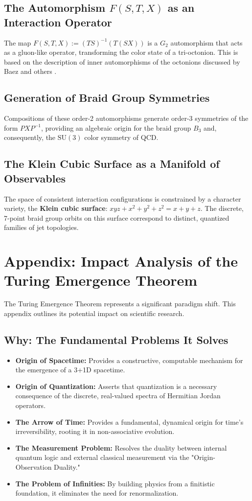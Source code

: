\documentclass[11pt, a4paper]{article}
\theoremstyle{definition}
\theoremstyle{remark}
\begin{document}
\subsection{The Automorphism $F(S,T,X)$ as an Interaction Operator}
The map $F(S,T,X) := (TS)^{-1}(T(SX))$ is a $G_2$ automorphism that acts as a gluon-like operator, transforming the color state of a tri-octonion. This is based on the description of inner automorphisms of the octonions discussed by Baez and others \cite{BaezBlog}.

\subsection{Generation of Braid Group Symmetries}
Compositions of these order-2 automorphisms generate order-3 symmetries of the form $PXP^{-1}$, providing an algebraic origin for the braid group $B_3$ and, consequently, the $\mathrm{SU}(3)$ color symmetry of QCD.

\subsection{The Klein Cubic Surface as a Manifold of Observables}
The space of consistent interaction configurations is constrained by a character variety, the \textbf{Klein cubic surface}: $xyz + x^2 + y^2 + z^2 = x + y + z$. The discrete, 7-point braid group orbits on this surface correspond to distinct, quantized families of jet topologies.

\section{Appendix: Impact Analysis of the Turing Emergence Theorem}
The Turing Emergence Theorem represents a significant paradigm shift. This appendix outlines its potential impact on scientific research.

\subsection*{Why: The Fundamental Problems It Solves}
\begin{itemize}
    \item \textbf{Origin of Spacetime:} Provides a constructive, computable mechanism for the emergence of a 3+1D spacetime.
    \item \textbf{Origin of Quantization:} Asserts that quantization is a necessary consequence of the discrete, real-valued spectra of Hermitian Jordan operators.
    \item \textbf{The Arrow of Time:} Provides a fundamental, dynamical origin for time's irreversibility, rooting it in non-associative evolution.
    \item \textbf{The Measurement Problem:} Resolves the duality between internal quantum logic and external classical measurement via the "Origin-Observation Duality."
    \item \textbf{The Problem of Infinities:} By building physics from a finitistic foundation, it eliminates the need for renormalization.
\end{itemize}
\end{document}
